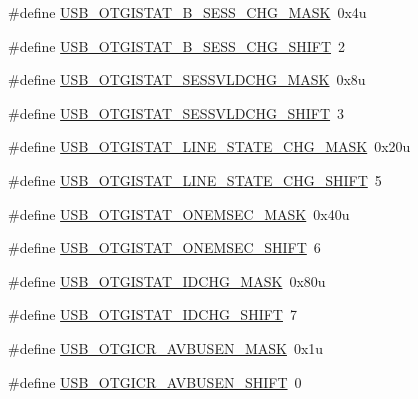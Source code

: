 \begin{DoxyCompactItemize}
\#define \hyperlink{group___u_s_b___register___masks_gafa204dddd4f034a5085b4599642689d7}{U\+S\+B\+\_\+\+O\+T\+G\+I\+S\+T\+A\+T\+\_\+\+B\+\_\+\+S\+E\+S\+S\+\_\+\+C\+H\+G\+\_\+\+M\+A\+SK}~0x4u
\item 
\#define \hyperlink{group___u_s_b___register___masks_gad18c5869e529e7edbe3251ee5e3ff33f}{U\+S\+B\+\_\+\+O\+T\+G\+I\+S\+T\+A\+T\+\_\+\+B\+\_\+\+S\+E\+S\+S\+\_\+\+C\+H\+G\+\_\+\+S\+H\+I\+FT}~2
\item 
\#define \hyperlink{group___u_s_b___register___masks_ga859962123dc28f346bafc99263efb811}{U\+S\+B\+\_\+\+O\+T\+G\+I\+S\+T\+A\+T\+\_\+\+S\+E\+S\+S\+V\+L\+D\+C\+H\+G\+\_\+\+M\+A\+SK}~0x8u
\item 
\#define \hyperlink{group___u_s_b___register___masks_gabcccd593607e1118c8283f20c69d7512}{U\+S\+B\+\_\+\+O\+T\+G\+I\+S\+T\+A\+T\+\_\+\+S\+E\+S\+S\+V\+L\+D\+C\+H\+G\+\_\+\+S\+H\+I\+FT}~3
\item 
\#define \hyperlink{group___u_s_b___register___masks_ga596dfbf3a2a0a6e6dcb1885ef11b4f8f}{U\+S\+B\+\_\+\+O\+T\+G\+I\+S\+T\+A\+T\+\_\+\+L\+I\+N\+E\+\_\+\+S\+T\+A\+T\+E\+\_\+\+C\+H\+G\+\_\+\+M\+A\+SK}~0x20u
\item 
\#define \hyperlink{group___u_s_b___register___masks_ga7cb2076a9bf32a49fdbc7efcfc5fb8bb}{U\+S\+B\+\_\+\+O\+T\+G\+I\+S\+T\+A\+T\+\_\+\+L\+I\+N\+E\+\_\+\+S\+T\+A\+T\+E\+\_\+\+C\+H\+G\+\_\+\+S\+H\+I\+FT}~5
\item 
\#define \hyperlink{group___u_s_b___register___masks_gaa59b13f2f60173eaf2844dd089a6b31a}{U\+S\+B\+\_\+\+O\+T\+G\+I\+S\+T\+A\+T\+\_\+\+O\+N\+E\+M\+S\+E\+C\+\_\+\+M\+A\+SK}~0x40u
\item 
\#define \hyperlink{group___u_s_b___register___masks_ga561173eac45ee89d7447416da7747ec2}{U\+S\+B\+\_\+\+O\+T\+G\+I\+S\+T\+A\+T\+\_\+\+O\+N\+E\+M\+S\+E\+C\+\_\+\+S\+H\+I\+FT}~6
\item 
\#define \hyperlink{group___u_s_b___register___masks_ga853101783769b0e8f1c68dc63ed5dbbc}{U\+S\+B\+\_\+\+O\+T\+G\+I\+S\+T\+A\+T\+\_\+\+I\+D\+C\+H\+G\+\_\+\+M\+A\+SK}~0x80u
\item 
\#define \hyperlink{group___u_s_b___register___masks_gac273f68643eb40324f598cb4a275b87b}{U\+S\+B\+\_\+\+O\+T\+G\+I\+S\+T\+A\+T\+\_\+\+I\+D\+C\+H\+G\+\_\+\+S\+H\+I\+FT}~7
\item 
\#define \hyperlink{group___u_s_b___register___masks_ga7754d512762167f81175b40ed5243050}{U\+S\+B\+\_\+\+O\+T\+G\+I\+C\+R\+\_\+\+A\+V\+B\+U\+S\+E\+N\+\_\+\+M\+A\+SK}~0x1u
\item 
\#define \hyperlink{group___u_s_b___register___masks_gac9ca8070fe9426a83bc59be69471edd3}{U\+S\+B\+\_\+\+O\+T\+G\+I\+C\+R\+\_\+\+A\+V\+B\+U\+S\+E\+N\+\_\+\+S\+H\+I\+FT}~0

\end{DoxyCompactItemize}
